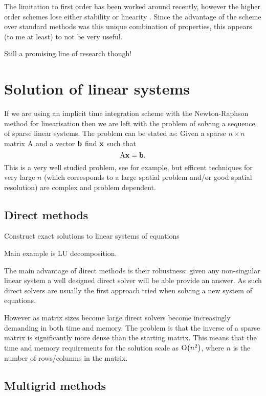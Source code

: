 The limitation to first order has been worked around recently, however the higher order schemes lose either stability or linearity \cite{Kritsikis2014}.
Since the advantage of the scheme over standard methods was this unique combination of properties, this appears (to me at least) to not be very useful.

Still a promising line of research though!



\section{Solution of linear systems}
\label{sec:solution-lin-sys}

If we are using an implicit time integration scheme with the Newton-Raphson method for linearisation then we are left with the problem of solving a sequence of sparse linear systems.
The problem can be stated as: Given a sparse $n \times n $ matrix $\mathrm{A}$ and a vector ${\mathbf{b}}$ find $\mathbf{x}$ such that
\begin{equation}
  \label{eq:linear-system}
  \mathrm{A} \mathbf{x} = {\mathbf{b}}.
\end{equation}
This is a very well studied problem, see for example\cite{Saad2000}, but efficent techniques for very large $n$ (which corresponds to a large spatial problem and/or good spatial resolution) are complex and problem dependent.


\subsection{Direct methods}
\label{sec:direct-methods}

Construct exact solutions to linear systems of equations

Main example is LU decomposition.

The main advantage of direct methods is their robustness: given any non-singular linear system a well designed direct solver will be able provide an answer.
As such direct solvers are usually the first approach tried when solving a new system of equations.

However as matrix sizes become large direct solvers become increasingly demanding in both time and memory.
The problem is that the inverse of a sparse matrix is significantly more dense than the starting matrix.
This means that the time and memory requirements for the solution scale as $\text{O}{\left( n^2 \right)}$, where $n$ is the number of rows/columns in the matrix.


\subsection{Multigrid methods}


